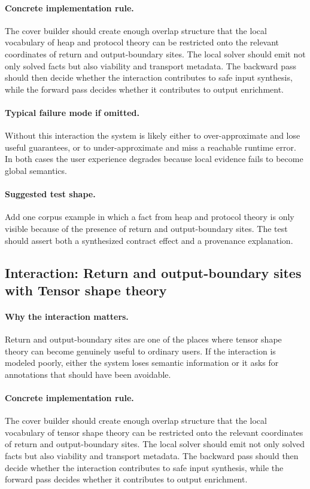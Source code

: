 \documentclass[11pt]{report}
\theoremstyle{definition}
\theoremstyle{plain}
\begin{document}
\paragraph{Concrete implementation rule.}
The cover builder should create enough overlap structure that the local
vocabulary of heap and protocol theory can be restricted onto the relevant
coordinates of return and output-boundary sites. The local solver should emit not only
solved facts but also viability and transport metadata. The backward pass
should then decide whether the interaction contributes to safe input
synthesis, while the forward pass decides whether it contributes to output
enrichment.

\paragraph{Typical failure mode if omitted.}
Without this interaction the system is likely either to over-approximate and
lose useful guarantees, or to under-approximate and miss a reachable runtime
error. In both cases the user experience degrades because local evidence
fails to become global semantics.

\paragraph{Suggested test shape.}
Add one corpus example in which a fact from heap and protocol theory is only
visible because of the presence of return and output-boundary sites. The test should
assert both a synthesized contract effect and a provenance explanation.

\subsection{Interaction: Return and output-boundary sites with Tensor shape theory}

\paragraph{Why the interaction matters.}
Return and output-boundary sites are one of the places where tensor shape theory can become
genuinely useful to ordinary users. If the interaction is modeled poorly,
either the system loses semantic information or it asks for annotations that
should have been avoidable.

\paragraph{Concrete implementation rule.}
The cover builder should create enough overlap structure that the local
vocabulary of tensor shape theory can be restricted onto the relevant
coordinates of return and output-boundary sites. The local solver should emit not only
solved facts but also viability and transport metadata. The backward pass
should then decide whether the interaction contributes to safe input
synthesis, while the forward pass decides whether it contributes to output
enrichment.
\end{document}
